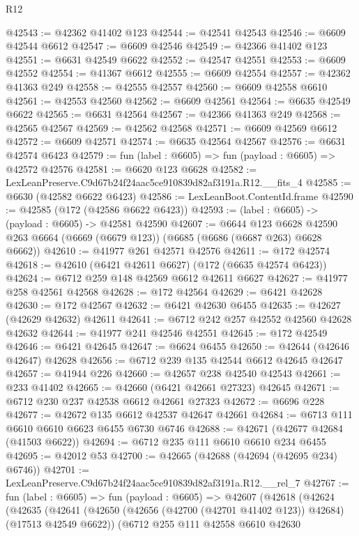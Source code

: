 \begin{lexlean}{R12}
\begin{coremodule}
@42543 := @42362 @41402 @123
@42544 := @42541 @42543
@42546 := @6609 @42544 @6612
@42547 := @6609 @42546
@42549 := @42366 @41402 @123
@42551 := @6631 @42549 @6622
@42552 := @42547 @42551
@42553 := @6609 @42552
@42554 := @41367 @6612
@42555 := @6609 @42554
@42557 := @42362 @41363 @249
@42558 := @42555 @42557
@42560 := @6609 @42558 @6610
@42561 := @42553 @42560
@42562 := @6609 @42561
@42564 := @6635 @42549 @6622
@42565 := @6631 @42564
@42567 := @42366 @41363 @249
@42568 := @42565 @42567
@42569 := @42562 @42568
@42571 := @6609 @42569 @6612
@42572 := @6609 @42571
@42574 := @6635 @42564 @42567
@42576 := @6631 @42574 @6423
@42579 := fun (label : @6605) => fun (payload : @6605) => @42572 @42576
@42581 := @6620 @123 @6628
@42582 := LexLeanPreserve.C9d67b24f24aac5ce910839d82af3191a.R12.__fits_4
@42585 := @6630 (@42582 @6622 @6423)
@42586 := LexLeanBoot.ContentId.frame
@42590 := @42585 (@172 (@42586 @6622 @6423))
@42593 := (label : @6605) -> (payload : @6605) -> @42581 @42590
@42607 := @6644
    @123
    @6628
    @42590
    @263
    @6664
    (@6669 (@6679 @123))
    (@6685 (@6686 (@6687 @263) @6628 @6662))
@42610 := @41977 @261 @42571 @42576
@42611 := @172 @42574
@42618 := @42610 (@6421 @42611 @6627) (@172 (@6635 @42574 @6423))
@42624 := @6712 @259 @148 @42569 @6612 @42611 @6627
@42627 := @41977 @258 @42561 @42568
@42628 := @172 @42564
@42629 := @6421 @42628
@42630 := @172 @42567
@42632 := @6421 @42630 @6455
@42635 := @42627 (@42629 @42632) @42611
@42641 := @6712 @242 @257 @42552 @42560 @42628 @42632
@42644 := @41977 @241 @42546 @42551
@42645 := @172 @42549
@42646 := @6421 @42645
@42647 := @6624 @6455
@42650 := @42644 (@42646 @42647) @42628
@42656 := @6712 @239 @135 @42544 @6612 @42645 @42647
@42657 := @41944 @226
@42660 := @42657 @238 @42540 @42543
@42661 := @233 @41402
@42665 := @42660 (@6421 @42661 @27323) @42645
@42671 := @6712 @230 @237 @42538 @6612 @42661 @27323
@42672 := @6696 @228
@42677 := @42672 @135 @6612 @42537 @42647 @42661
@42684 := @6713 @111 @6610 @6610 @6623 @6455 @6730 @6746
@42688 := @42671 (@42677 @42684 (@41503 @6622))
@42694 := @6712 @235 @111 @6610 @6610 @234 @6455
@42695 := @42012 @53
@42700 := @42665 (@42688 (@42694 (@42695 @234) @6746))
@42701 := LexLeanPreserve.C9d67b24f24aac5ce910839d82af3191a.R12.__rel_7
@42767 := fun (label : @6605) =>
  fun (payload : @6605) =>
  @42607
    (@42618
      (@42624
        (@42635
          (@42641
            (@42650 (@42656 (@42700 (@42701 @41402 @123)) @42684) (@17513 @42549 @6622))
            (@6712
              @255
              @111
              @42558
              @6610
              @42630

\end{coremodule}
\end{lexlean}
